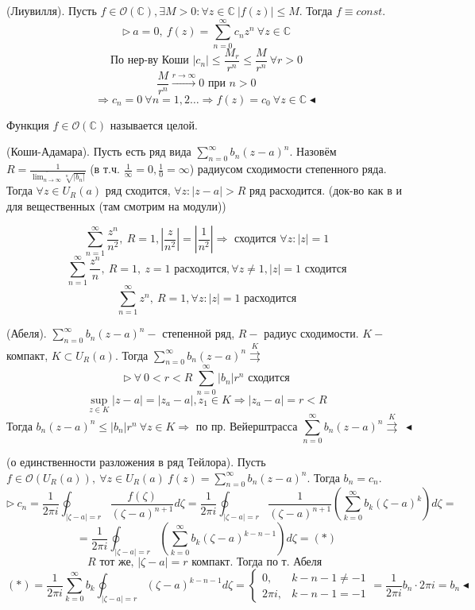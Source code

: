  (Лиувилля).
Пусть $f \in \mathcal{O}(\mathbb{C}), \exists M > 0 : \forall z \in \mathbb{C} \ |f(z)| \leq M$. Тогда $f \equiv const$.
\[\triangleright \ a = 0, \ f(z) = \sum_{n=0}^\infty c_n z^n \ \forall z \in \mathbb{C}\]
\[\text{По нер-ву Коши } |c_n| \leq \frac{M_r}{r^n} \leq \frac{M}{r^n} \ \forall r > 0\]
\[\frac{M}{r^n} \overset{r\to\infty}{\to}0 \text{ при } n > 0\]
\[\Rightarrow c_n = 0 \ \forall n = 1, 2 \ldots \Rightarrow f(z) = c_0 \ \forall z \in \mathbb{C} \blacktriangleleft\]

 Функция $f \in \mathcal{O}(\mathbb{C})$ называется целой.

 (Коши-Адамара).
Пусть есть ряд вида $\sum_{n=0}^\infty b_n (z-a)^n$. Назовём $R = \frac{1}{\overline{\lim_{n\to\infty}} \sqrt[n]{|b_n|}}$ (в т.ч. $\frac{1}{\infty} = 0, \frac{1}{0} = \infty$) радиусом сходимости степенного ряда.
Тогда $\forall z \in U_R(a)$ ряд сходится, $\forall z : |z-a|>R$ ряд расходится. (док-во как в и для вещественных (там смотрим на модули))

\[\sum_{n=1}^\infty \frac{z^n}{n^2}, \ R = 1, \left|\frac{z}{n^2}\right| = \left|\frac{1}{n^2}\right| \Rightarrow \text{ сходится } \forall z: |z| = 1\]
\[\sum_{n=1}^\infty \frac{z^n}{n}, \ R = 1, \ z = 1 \text{ расходится}, \forall z \neq 1, |z|=1 \text{ сходится}\]
\[\sum_{n=1}^\infty z^n, \ R = 1, \forall z : |z|=1 \text{ расходится}\]

 (Абеля).
$\sum_{n=0}^\infty b_n(z-a)^n -$ степенной ряд, $R - $ радиус сходимости. $K - $ компакт, $K \subset U_R(a)$. Тогда $\sum_{n=0}^\infty b_n(z-a)^n \overset{K}{\rightrightarrows}$ 
\[\triangleright \ \forall \ 0<r<R \ \sum_{n=0}^\infty |b_n| r^n \text{ сходится}\]
\[\sup_{z \in K} |z-a| = |z_a-a|, z_1 \in K \Rightarrow |z_a-a|=r < R\]
\[\text{Тогда } b_n(z-a)^n \leq |b_n| r^n \ \forall z \in K \Rightarrow \text{ по пр. Вейерштрасса } \sum_{n=0}^\infty b_n(z-a)^n \overset{K}{\rightrightarrows} \ \blacktriangleleft\]

 (о единственности разложения в ряд Тейлора).
Пусть $f \in \mathcal{O}(U_R(a)), \ \forall z \in U_R(a) \ f(z) = \sum_{n=0}^\infty b_n(z-a)^n.$ Тогда $b_n=c_n.$
\[\triangleright \ c_n = \frac{1}{2\pi i} \oint_{|\zeta-a|=r} \frac{f(\zeta)}{(\zeta-a)^{n+1}}d\zeta = \frac{1}{2\pi i} \oint_{|\zeta-a|=r} \frac{1}{(\zeta-a)^{n+1}} \left(\sum_{k=0}^\infty b_k(\zeta-a)^k\right) d\zeta =\]
\[=\frac{1}{2\pi i} \oint_{|\zeta-a|=r} \left(\sum_{k=0}^\infty b_k(\zeta-a)^{k-n-1}\right) d\zeta = (*)\]
\[R \text{ тот же, } |\zeta-a|=r \text{ компакт. Тогда по т. Абеля }\]
\[(*) = \frac{1}{2\pi i} \sum_{k=0}^\infty b_k \oint_{|\zeta-a|=r} (\zeta-a)^{k-n-1}d\zeta = \begin{cases}
    0, & k-n-1 \neq -1 \\
    2\pi i, & k - n - 1 = -1
\end{cases} = \frac{1}{2\pi i} b_n \cdot 2\pi i = b_n \blacktriangleleft\]